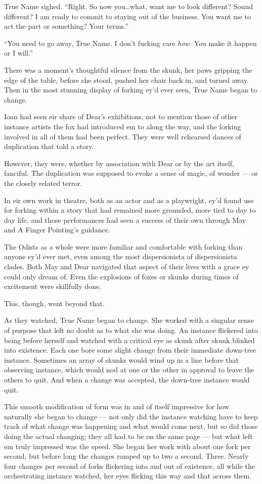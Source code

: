 True Name sighed. ``Right. So now you\ldots what, want me to look different? Sound different? I am ready to commit to staying out of the business. You want me to act the part or something? Your terms.''

``You need to go away, True Name. I don't fucking care \emph{how.} You make it happen or I will.''

There was a moment's thoughtful silence from the skunk, her paws gripping the edge of the table, before she stood, pushed her chair back in, and turned away. Then in the most stunning display of forking ey'd ever seen, True Name began to change.

Ioan had seen eir share of Dear's exhibitions, not to mention those of other instance artists the fox had introduced em to along the way, and the forking involved in all of them had been perfect. They were well rehearsed dances of duplication that told a story.

However, they were, whether by association with Dear or by the art itself, fanciful. The duplication was supposed to evoke a sense of magic, of wonder — or the closely related terror.

In eir own work in theatre, both as an actor and as a playwright, ey'd found use for forking within a story that had remained more grounded, more tied to day to day life, and those performances had seen a success of their own through May and A Finger Pointing's guidance.

The Odists as a whole were more familiar and comfortable with forking than anyone ey'd ever met, even among the most dispersionista of dispersionista clades. Both May and Dear navigated that aspect of their lives with a grace ey could only dream of. Even the explosions of foxes or skunks during times of excitement were skillfully done.

This, though, went beyond that.

As they watched, True Name began to change. She worked with a singular sense of purpose that left no doubt as to what she was doing. An instance flickered into being before herself and watched with a critical eye as skunk after skunk blinked into existence. Each one bore some slight change from their immediate down-tree instance. Sometimes an array of skunks would wind up in a line before that observing instance, which would nod at one or the other in approval to leave the others to quit. And when a change was accepted, the down-tree instance would quit.

This smooth modification of form was in and of itself impressive for how naturally she began to change — not only did the instance watching have to keep track of what change was happening and what would come next, but so did those doing the actual changing; they all had to be on the same page — but what left em truly impressed was the speed. She began her work with about one fork per second, but before long the changes ramped up to two a second. Three. Nearly four changes per second of forks flickering into and out of existence, all while the orchestrating instance watched, her eyes flicking this way and that across them.

